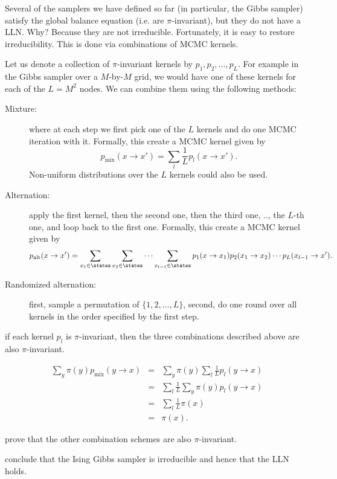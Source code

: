 \documentclass{article}
\begin{document}
Several of the samplers we have defined so far (in particular, the Gibbs sampler) satisfy the global balance equation (i.e. are $\pi$-invariant), but they do not have a LLN. Why? Because they are not irreducible. Fortunately, it is easy to restore irreducibility. This is done via combinations of MCMC kernels.

 Let us denote a collection of $\pi$-invariant kernels by $p_1, p_2, \dots, p_L$. For example in the Gibbs sampler over a $M$-by-$M$ grid, we would have one of these kernels for each of the $L = M^2$ nodes. We can combine them using the following methods:
\begin{description}
  \item[Mixture:] where at each step we first pick one of the $L$ kernels and do one MCMC iteration with it. Formally, this create a MCMC kernel given by \[ p_\text{mix}(x\to x') = \sum_l \frac{1}{L} p_l(x \to x'). \]Non-uniform distributions over the $L$ kernels could also be used.
  \item[Alternation:] apply the first kernel, then the second one, then the third one, .., the $L$-th one, and loop back to the first one. Formally, this create a MCMC kernel given by \[ p_\textrm{alt}(x \to x') = \sum_{x_1\in\states} \sum_{x_2\in\states} \cdots \sum_{x_{l-1}\in\states} p_1(x \to x_1) p_2(x_1 \to x_2) \cdots p_L(x_{l-1} \to x'). \]
  \item[Randomized alternation:] first, sample a permutation of $\{1, 2, \dots, L\}$, second, do one round over all kernels in the order specified by the first step.
\end{description} 

 if each kernel $p_l$ is $\pi$-invariant, then the three combinations described above are also $\pi$-invariant.  

\begin{eqnarray}
\sum_y \pi(y) p_\textrm{mix}(y \to x) &=& \sum_y \pi(y) \sum_l \frac{1}{L} p_l(y \to x) \\
&=& \sum_l \frac{1}{L} \sum_y \pi(y) p_l(y \to x) \\
&=& \sum_l \frac{1}{L} \pi(x) \\
&=& \pi(x).
\end{eqnarray}

 prove that the other combination schemes are also $\pi$-invariant. 

 conclude that the Ising Gibbs sampler is irreducible and hence that the LLN holds. 
\end{document}
